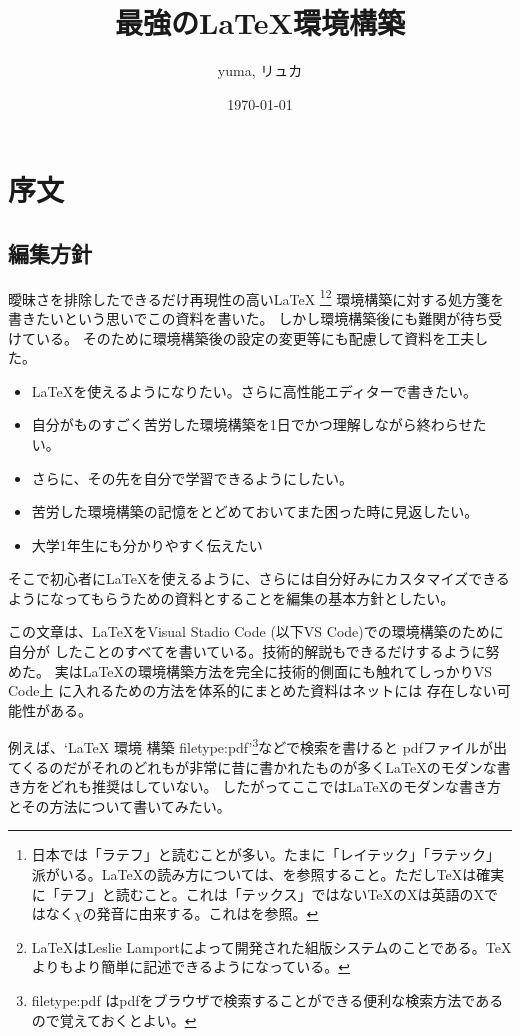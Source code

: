 \documentclass[titlepage]{ltjsarticle}
\begin{document}
\title{最強の\LaTeX 環境構築}
\author{yuma, リュカ}
\date{\today}
\maketitle
\section{序文}
\subsection{編集方針}

曖昧さを排除したできるだけ再現性の高い\LaTeX \index{\LaTeX}
\footnote{日本では「ラテフ」と読むことが多い。たまに「レイテック」「ラテック」派がいる。\LaTeX の読み方については、\cite{文書システムLaTeX}\cite{LaTeXの読み方}を参照すること。ただし\TeX は確実に「テフ」と読むこと。これは「テックス」ではない\TeX のXは英語のXではなく\(\chi\)の発音に由来する。これは\cite{TeXの発音について}を参照。}\footnote{\LaTeX はLeslie Lamportによって開発された組版システムのことである。\TeX よりもより簡単に記述できるようになっている。}
環境構築に対する処方箋を書きたいという思いでこの資料を書いた。
しかし環境構築後にも難関が待ち受けている。
そのために環境構築後の設定の変更等にも配慮して資料を工夫した。
\begin{itemize}
  \item \LaTeX を使えるようになりたい。さらに高性能エディターで書きたい。
  \item 自分がものすごく苦労した環境構築を1日でかつ理解しながら終わらせたい。
  \item さらに、その先を自分で学習できるようにしたい。
  \item 苦労した環境構築の記憶をとどめておいてまた困った時に見返したい。
  \item 大学1年生にも分かりやすく伝えたい
\end{itemize}
そこで初心者に\LaTeX を使えるように、さらには自分好みにカスタマイズできるようになってもらうための資料とすることを編集の基本方針としたい。

この文章は、\LaTeX をVisual Stadio Code (以下VS Code)での環境構築のために自分が
したことのすべてを書いている。技術的解説もできるだけするように努めた。
実は\LaTeX の環境構築方法を完全に技術的側面にも触れてしっかりVS Code上
に入れるための方法を体系的にまとめた資料はネットには
存在しない可能性がある。

例えば、`LaTeX 環境 構築 filetype:pdf'\footnote{filetype:pdf はpdfをブラウザで検索することができる便利な検索方法であるので覚えておくとよい。}などで検索を書けると
pdfファイルが出てくるのだがそれのどれもが非常に昔に書かれたものが多く\LaTeX のモダンな書き方をどれも推奨はしていない。
したがってここでは\LaTeX のモダンな書き方とその方法について書いてみたい。
\end{document}
